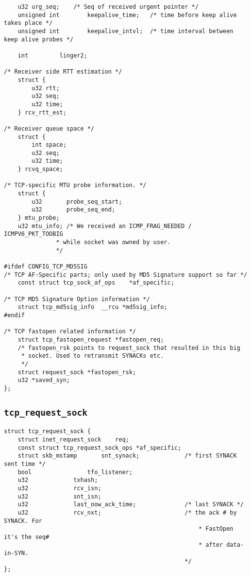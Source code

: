 \begin{verbatim}
    u32 urg_seq;    /* Seq of received urgent pointer */
    unsigned int        keepalive_time;   /* time before keep alive takes place */
    unsigned int        keepalive_intvl;  /* time interval between keep alive probes */

    int         linger2;

/* Receiver side RTT estimation */
    struct {
        u32 rtt;
        u32 seq;
        u32 time;
    } rcv_rtt_est;

/* Receiver queue space */
    struct {
        int space;
        u32 seq;
        u32 time;
    } rcvq_space;

/* TCP-specific MTU probe information. */
    struct {
        u32       probe_seq_start;
        u32       probe_seq_end;
    } mtu_probe;
    u32 mtu_info; /* We received an ICMP_FRAG_NEEDED / ICMPV6_PKT_TOOBIG
               * while socket was owned by user.
               */

#ifdef CONFIG_TCP_MD5SIG
/* TCP AF-Specific parts; only used by MD5 Signature support so far */
    const struct tcp_sock_af_ops    *af_specific;

/* TCP MD5 Signature Option information */
    struct tcp_md5sig_info  __rcu *md5sig_info;
#endif

/* TCP fastopen related information */
    struct tcp_fastopen_request *fastopen_req;
    /* fastopen_rsk points to request_sock that resulted in this big
     * socket. Used to retransmit SYNACKs etc.
     */
    struct request_sock *fastopen_rsk;
    u32 *saved_syn;
};
\end{verbatim}
        \subsection{\texttt{tcp_request_sock}}
\begin{verbatim}
struct tcp_request_sock {
    struct inet_request_sock    req;
    const struct tcp_request_sock_ops *af_specific;
    struct skb_mstamp       snt_synack;             /* first SYNACK sent time */
    bool                tfo_listener;
    u32             txhash;
    u32             rcv_isn;
    u32             snt_isn;
    u32             last_oow_ack_time;              /* last SYNACK */
    u32             rcv_nxt;                        /* the ack # by SYNACK. For
                                                        * FastOpen it's the seq#
                                                        * after data-in-SYN.
                                                    */
};
\end{verbatim}
